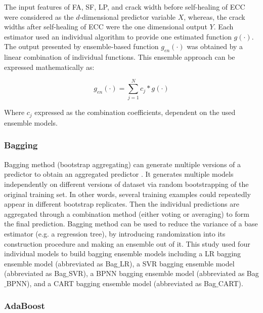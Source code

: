 \documentclass[11pt]{article}
\begin{document}
	The input features of FA, SF, LP, and crack width before self-healing of ECC were considered as the $d$-dimensional predictor variable $X$, whereas, the crack widths after self-healing of ECC were the one dimensional output $Y$.  Each estimator used an individual algorithm to provide one estimated function $g(\cdot)$. The output presented by ensemble-based function $g_{en}(\cdot)$ was obtained by a linear combination of individual functions. This ensemble approach can be expressed mathematically as:
	
	\begin{equation}
	g_{en}(\cdot) = \sum_{j=1}^{N}c_j *g(\cdot)
	\end{equation}
	
	Where $c_j$ expressed as the combination coefficients, dependent on the used ensemble models.  
	
	\subsubsection{Bagging}
	Bagging method (bootstrap aggregating) can generate multiple versions of a predictor to obtain an aggregated predictor \cite{breiman1996bagging}. It generates multiple models independently on different versions of dataset via random bootstrapping of the original training set. In other words, several training examples could repeatedly appear in different bootstrap replicates. Then the individual predictions are aggregated through a combination method (either voting or averaging) to form the final prediction. Bagging method can be used to reduce the variance of a base estimator (e.g. a regression tree), by introducing randomization into its construction procedure and making an ensemble out of it.
This study used four individual models to build bagging ensemble models including a LR bagging ensemble model (abbreviated as Bag$\_$LR), a SVR bagging ensemble model (abbreviated as Bag$\_$SVR), a BPNN bagging ensemble model (abbreviated as Bag$\_$BPNN), and a CART bagging ensemble model (abbreviated as Bag$\_$CART).


	
	\subsubsection{AdaBoost}
\end{document}

